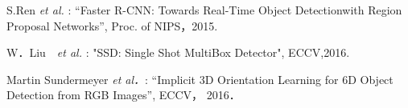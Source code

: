 \documentclass{jsarticle}
\begin{document}
\begin{thebibliography}{1}

{\scriptsize
{}
S.Ren {\em et al. }: ``Faster R-CNN: Towards Real-Time Object Detectionwith Region Proposal Networks'', Proc. of NIPS，2015.}


{\scriptsize
{}
W．Liu　{\em et al. }: "SSD: Single Shot MultiBox Detector", ECCV,2016.}

{\scriptsize 
{}
Martin Sundermeyer {\em et al．}: ``Implicit 3D Orientation Learning for 6D Object Detection from RGB Images'', ECCV， 2016．}

\end{thebibliography}
\end{document}
